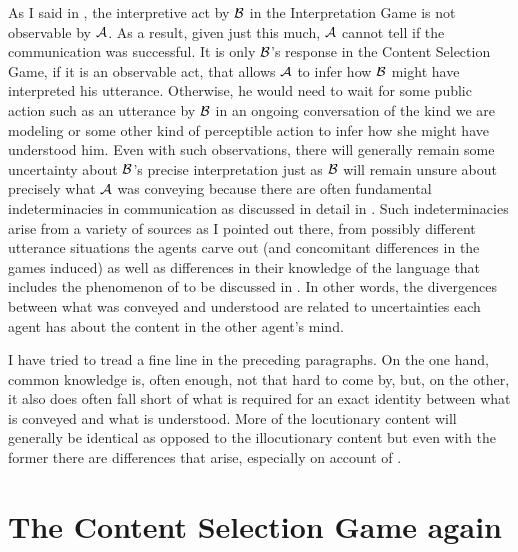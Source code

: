 As I said in \citet[46]{parikh:diss}, the interpretive act by $\cal B$ in the Interpretation Game is not observable by $\cal A$. As a result, given just this much, $\cal A$ cannot tell if the communication was successful. It is only $\cal B$'s response in the Content Selection Game, if it is an observable act, that allows $\cal A$ to infer how $\cal B$ might have interpreted his utterance. Otherwise, he would need to wait for some public action such as an utterance by $\cal B$ in an ongoing conversation of the kind we are modeling or some other kind of perceptible action to infer how she might have understood him. Even with such observations, there will generally remain some uncertainty about $\cal B$'s precise interpretation just as $\cal B$ will remain unsure about precisely what $\cal A$ was conveying because there are often fundamental indeterminacies in communication as discussed in detail in \citet[Chapter~5]{parikh:le}. Such indeterminacies arise from a variety of sources as I pointed out there, from possibly different utterance situations the agents carve out (and concomitant differences in the games induced) as well as differences in their knowledge of the language that includes the phenomenon of  to be discussed in . In other words, the divergences between what was conveyed and understood are related to uncertainties each agent has about the content in the other agent's mind.

I have tried to tread a fine line in the preceding paragraphs. On the one hand, common knowledge is, often enough, not that hard to come by, but, on the other, it also does often fall short of what is required for an exact identity between what is conveyed and what is understood. More of the locutionary content will generally be identical as opposed to the illocutionary content but even with the former there are differences that arise, especially on account of .


\section{The Content Selection Game again} \label{sec:content selection game again}

